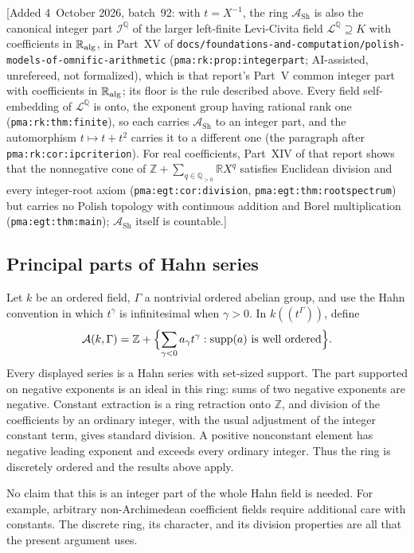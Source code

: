 \documentclass[11pt]{article}
\theoremstyle{definition}
\theoremstyle{remark}
\newcommand{\R}{\mathbb{R}}
\newcommand{\Z}{\mathbb{Z}}
\newcommand{\supp}{\operatorname{supp}}
\newcommand{\Q}{\mathbb{Q}}
\newcommand{\Asc}{\mathcal{A}}
\newcommand{\replabel}[1]{\nolinkurl{#1}}
\begin{document}
\textup{[}Added 4~October 2026, batch~92: with $t=X^{-1}$, the ring
$\Asc_{\mathrm{Sh}}$ is also the canonical integer part $\mathcal I^{\Q}$ of
the larger left-finite Levi-Civita field $\mathcal L^{\Q}\supseteq K$ with
coefficients in $\R_{\rm alg}$, in Part~XV of
\nolinkurl{docs/foundations-and-computation/polish-models-of-omnific-arithmetic}
(\replabel{pma:rk:prop:integerpart}; AI-assisted, unrefereed, not
formalized), which is that report's Part~V common integer part with
coefficients in $\R_{\rm alg}$; its floor is the rule described above. Every
field self-embedding of $\mathcal L^{\Q}$ is onto, the exponent group having
rational rank one (\replabel{pma:rk:thm:finite}), so each carries
$\Asc_{\mathrm{Sh}}$ to an integer part, and the automorphism
$t\mapsto t+t^2$ carries it to a different one (the paragraph after
\replabel{pma:rk:cor:ipcriterion}). For real coefficients, Part~XIV of that
report shows that the nonnegative cone of
$\Z+\sum_{q\in\Q_{>0}}\R X^q$ satisfies Euclidean division and every
integer-root axiom (\replabel{pma:egt:cor:division},
\replabel{pma:egt:thm:rootspectrum}) but carries no Polish topology with
continuous addition and Borel multiplication
(\replabel{pma:egt:thm:main}); $\Asc_{\mathrm{Sh}}$ itself is countable.\textup{]}

\subsection{Principal parts of Hahn series}
Let $k$ be an ordered field, $\Gamma$ a nontrivial ordered abelian group,
and use the Hahn convention in which $t^\gamma$ is infinitesimal when
$\gamma>0$. In $k((t^\Gamma))$, define
\[
 \Asc(k,\Gamma)=\Z+\Bigl\{\sum_{\gamma<0}a_\gamma t^\gamma:
       \supp(a)\text{ is well ordered}\Bigr\}.
\]
Every displayed series is a Hahn series with set-sized support. The part
supported on negative exponents is an ideal in this ring: sums of two
negative exponents are negative. Constant extraction is a ring retraction
onto $\Z$, and division of the coefficients by an ordinary integer, with
the usual adjustment of the integer constant term, gives standard
division. A positive nonconstant element has negative leading exponent and
exceeds every ordinary integer. Thus the ring is discretely ordered and
the results above apply.

No claim that this is an integer part of the whole Hahn field is needed.
For example, arbitrary non-Archimedean coefficient fields require
additional care with constants. The discrete ring, its character, and its
division properties are all that the present argument uses.
\end{document}
